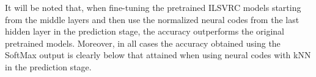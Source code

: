 \documentclass[final, twocolumn]{elsarticle}
\begin{document}
It will be noted that, when fine-tuning the pretrained ILSVRC models starting from the middle layers and then use the normalized neural codes from the last hidden layer in the prediction stage, the accuracy outperforms the original pretrained models. Moreover, in all cases the accuracy obtained using the SoftMax output is clearly below that attained when using neural codes with kNN in the prediction stage.

\begin{table}
\renewcommand{\arraystretch}{1}
\centering
{}
\caption{Top-1 accuracy using the SoftMax output (without kNN) for the different models and training strategies evaluated.}
\label{tab:dnn_train}
\end{table}
\end{document}
